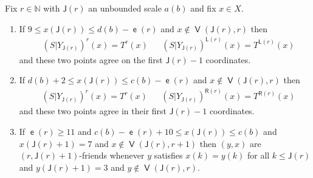 \documentclass[AHL,Unicode,longabstracts,published]{cedram}
\DeclareMathOperator{\lst}{\mathsf{e}}
\DeclareMathOperator{\bad}{\mathsf{V}}
\newcommand{\N}{\mathbb{N}}
\newcommand{\lft}{\mathsf{L}}
\newcommand{\rht}{\mathsf{R}}
\newcommand{\scl}{\mathsf{J}}
\begin{document}
\begin{coro}\label{cor:pos reduc conseq}
Fix $r \in \N$ with $\scl(r)$ an unbounded scale $a(b)$ and fix $x \in X$.
\begin{enumerate}
\item\label{cor:pos red T left}
If $9 \le x(\scl(r)) \le d(b)-\lst(r)$ and $x \not\in \bad(\scl(r),r)$ then
\begin{align*}
&(S|Y_{\scl(r)})^r(x)=T^r(x)
&&(S|Y_{\scl(r)})^{\lft(r)}(x) = T^{\lft(r)}(x)
\end{align*}
and these two points agree on the first $\scl(r)-1$ coordinates.
\item\label{cor:pos red T right}
If $d(b) + 2 \le x(\scl(r)) \le c(b) - \lst(r)$ and $x \not\in \bad(\scl(r),r)$ then
\begin{align*}
&(S|Y_{\scl(r)})^r(x) = T^r(x)
&&(S|Y_{\scl(r)})^{\rht(r)}(x) = T^{\rht(r)}(x)
\end{align*}
and these two points agree in their first $\scl(r)-1$ coordinates.
\item\label{cor:pos red T friends}
If $\lst(r) \geq 11$ and $c(b) - \lst(r) + 10 \le x(\scl(r)) \le c(b)$ and $x(\scl(r)+1) = 7$ and $x \not\in \bad(\scl(r),r+1)$ then $(y,x)$ are $(r,\scl(r)+1)$-friends whenever $y$ satisfies $x(k) = y(k)$ for all $k \le \scl(r)$ and $y(\scl(r)+1) = 3$ and $y \not\in \bad(\scl(r),r)$.
\end{enumerate}
\end{coro}
\end{document}
